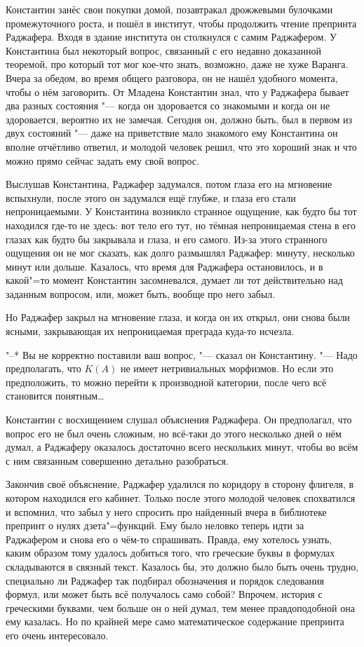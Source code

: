 Константин занёс свои покупки домой, позавтракал дрожжевыми булочками
промежуточного роста, и пошёл в институт, чтобы продолжить чтение препринта
Раджафера.
Входя в здание института он столкнулся с самим Раджафером.
У Константина был некоторый вопрос, связанный с его недавно доказанной теоремой,
про который тот мог кое-что знать, возможно, даже не хуже Варанга.
Вчера за обедом, во время общего разговора, он не нашёл удобного момента, чтобы
о нём заговорить.
От Младена Константин знал, что у Раджафера бывает два разных состояния "---
когда он здоровается со знакомыми и когда он не здоровается, вероятно их не
замечая.
Сегодня он, должно быть, был в первом из двух состояний "--- даже на приветствие
мало знакомого ему Константина он вполне отчётливо ответил, и молодой человек
решил, что это хороший знак и что можно прямо сейчас задать ему свой вопрос.

Выслушав Константина, Раджафер задумался, потом глаза его на мгновение
вспыхнули, после этого он задумался ещё глубже, и глаза его стали
непроницаемыми.
У Константина возникло странное ощущение, как будто бы тот находился где-то не
здесь: вот тело его тут, но тёмная непроницаемая стена в его глазах как будто бы
закрывала и глаза, и его самого.
Из-за этого странного ощущения он не мог сказать, как долго размышлял Раджафер:
минуту, несколько минут или дольше.
Казалось, что время для Раджафера остановилось, и в какой"=то момент Константин
засомневался, думает ли тот действительно над заданным вопросом, или, может
быть, вообще про него забыл.

Но Раджафер закрыл на мгновение глаза, и когда он их открыл, они снова были
ясными, закрывающая их непроницаемая преграда куда-то исчезла.

"--* Вы не корректно поставили ваш вопрос, "--- сказал он Константину.
"--- Надо предполагать, что $K(A)$ не имеет нетривиальных морфизмов.
Но если это предположить, то можно перейти к производной категории, после чего
всё становится понятным\ldots

Константин с восхищением слушал объяснения Раджафера.
Он предполагал, что вопрос его не был очень сложным, но всё-таки до этого
несколько дней о нём думал, а Раджаферу оказалось достаточно всего нескольких
минут, чтобы во всём с ним связанным совершенно детально разобраться.

Закончив своё объяснение, Раджафер удалился по коридору в сторону флигеля, в
котором находился его кабинет.
Только после этого молодой человек спохватился и вспомнил, что забыл у него
спросить про найденный вчера в библиотеке препринт о нулях дзета"=функций.
Ему было неловко теперь идти за Раджафером и снова его о чём-то спрашивать.
Правда, ему хотелось узнать, каким образом тому удалось добиться того, что
греческие буквы в формулах складываются в связный текст.
Казалось бы, это должно было быть очень трудно, специально ли Раджафер так
подбирал обозначения и порядок следования формул, или может быть всё получалось
само собой?
Впрочем, история с греческими буквами, чем больше он о ней думал, тем менее
правдоподобной она ему казалась.
Но по крайней мере само математическое содержание препринта его очень
интересовало.

